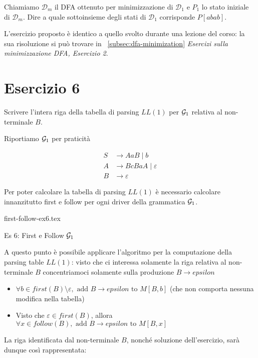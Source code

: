 \documentclass[class=book, crop=false, oneside, 12pt]{standalone}
\begin{document}
Chiamiamo \(\mathcal{D}_m\) il DFA ottenuto per minimizzazione di \(\mathcal{D}_1\) e \(P_1\) lo stato iniziale di \(\mathcal{D}_m\). Dire a quale sottoinsieme degli stati di \(\mathcal{D}_1\) corrisponde \(P[abab]\).

L'esercizio proposto è identico a quello svolto durante una lezione del corso: la sua risoluzione si può trovare in ~\ref{subsec:dfa-minimization} \emph{Esercizi sulla minimizzazione DFA, Esercizio 2}.

\section*{Esercizio 6}

Scrivere l’intera riga della tabella di parsing \(LL(1)\) per \(\mathcal{G}_1\) relativa al non-terminale \(B\).

Riportiamo \(\mathcal{G}_1\) per praticità

\begin{align*}
    S &\to AaB \mid b \\
    A &\to BcBaA \mid \varepsilon \\
    B &\to \varepsilon
\end{align*}

Per poter calcolare la tabella di parsing \(LL(1)\) è necessario calcolare innanzitutto first e follow per ogni driver della grammatica \(\mathcal{G}_1\).

\begin{table}[H]
    \centering
    {first-follow-ex6.tex}
    \caption{Es 6: First e Follow \(\mathcal{G}_1\)}
    \label{tab:first-follow-ex6}
\end{table}

A questo punto è possibile applicare l'algoritmo per la computazione della parsing table \(LL(1)\): visto che ci interessa solamente la riga relativa al non-terminale \(B\) concentriamoci solamente sulla produzione \(B \to epsilon\)

\begin{itemize}
    \item \(\forall b \in first(B) \setminus \varepsilon, \textrm{ add } B \to epsilon \textrm{ to } M[B, b]\) (che non comporta nessuna modifica nella tabella)
    \item Visto che \(\varepsilon \in first(B)\), allora \(\forall x \in follow(B), \textrm{ add } B \to epsilon \textrm{ to } M[B, x]\)
\end{itemize}

La riga identificata dal non-terminale \(B\), nonché soluzione dell'esercizio, sarà dunque così rappresentata:
\end{document}
